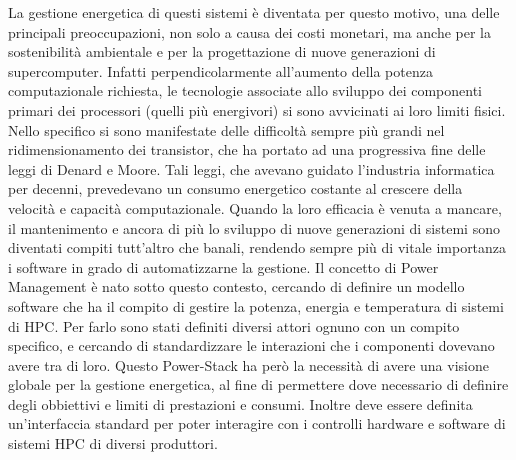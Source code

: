 La gestione energetica di questi sistemi è diventata per questo motivo, una delle principali preoccupazioni, non solo a causa dei costi monetari, ma anche per la sostenibilità ambientale e per la progettazione di nuove generazioni di supercomputer\cite{TODO}. Infatti perpendicolarmente all'aumento della potenza computazionale richiesta, le tecnologie associate allo sviluppo dei componenti primari dei processori (quelli più energivori) si sono avvicinati ai loro limiti fisici.
Nello specifico si sono manifestate delle difficoltà sempre più grandi nel ridimensionamento dei transistor, che ha portato ad una progressiva fine delle leggi di Denard e Moore\cite{TODO}. Tali leggi, che avevano guidato l'industria informatica per decenni, prevedevano un consumo energetico costante al crescere della velocità e capacità computazionale. Quando la loro efficacia è venuta a mancare, il mantenimento e ancora di più lo sviluppo di nuove generazioni di sistemi sono diventati compiti tutt'altro che banali, rendendo sempre più di vitale importanza i software in grado di automatizzarne la gestione. %
Il concetto di Power Management è nato sotto questo contesto, cercando di definire un modello software che ha il compito di gestire la potenza, energia e temperatura di sistemi di HPC. Per farlo sono stati definiti diversi attori ognuno con un compito specifico, e cercando di standardizzare le interazioni che i componenti dovevano avere tra di loro.
Questo Power-Stack ha però la necessità di avere una visione globale per la gestione energetica, al fine di permettere dove necessario di definire degli obbiettivi e limiti di prestazioni e consumi. Inoltre deve essere definita un'interfaccia standard per poter interagire con i controlli hardware e software di sistemi HPC di diversi produttori.
